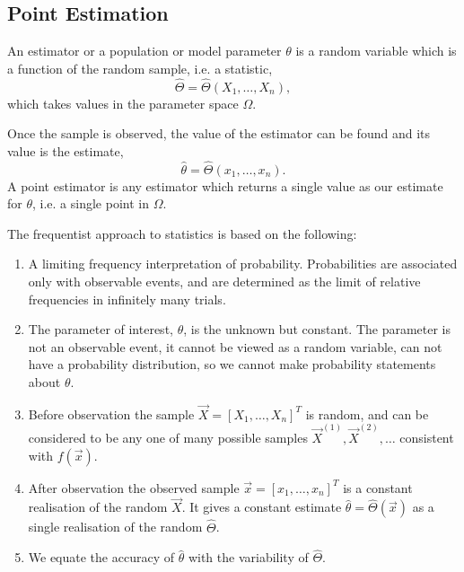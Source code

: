 \documentclass[10pt, a4paper]{article}
\begin{document}
\subsection{Point Estimation}
\begin{definition}
    An estimator or a population or model parameter $\theta$ is a random variable which is a function of the random sample,
    i.e. a statistic,
    \[
    \hat{\Theta} = \hat{\Theta}(X_1, \dotsc, X_n),
    \]
    which takes values in the parameter space $\Omega$.

    Once the sample is observed,
    the value of the estimator can be found and its value is the estimate,
    \[
    \hat{\theta} = \hat{\Theta}(x_1, \dotsc, x_n).
    \]
    A point estimator is any estimator which returns a single value as our estimate for $\theta$,
    i.e. a single point in $\Omega$.
\end{definition}

The frequentist approach to statistics is based on the following:
\begin{enumerate}[label = (\roman*)]
    \item A limiting frequency interpretation of probability.
    Probabilities are associated only with observable events,
    and are determined as the limit of relative frequencies in infinitely many trials.

    \item The parameter of interest,
    $\theta$,
    is the unknown but constant.
    The parameter is not an observable event,
    it cannot be viewed as a random variable,
    can not have a probability distribution,
    so we cannot make probability statements about $\theta$.

    \item Before observation the sample $\vec{X} = [X_1, \dotsc, X_n] ^ T$ is random,
    and can be considered to be any one of many possible samples $\vec{X} ^ {(1)}, \vec{X} ^ {(2)}, \dotsc$ consistent with $f(\vec{x})$.

    \item After observation the observed sample $\vec{x} = [x_1, \dotsc, x_n] ^ T$ is a constant realisation of the random $\vec{X}$.
    It gives a constant estimate $\hat{\theta} = \hat{\Theta}(\vec{x})$ as a single realisation of the random $\hat{\Theta}$.

    \item We equate the accuracy of $\hat{\theta}$ with the variability of $\hat{\Theta}$.
\end{enumerate}
\end{document}
